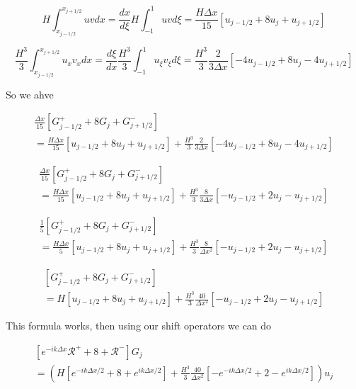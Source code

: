 \documentclass[12pt]{article}
\begin{document}
\[H\int_{x_{j-1/2}}^{x_{j+1/2}} uv dx = \frac{dx}{d\xi}H\int_{-1}^{1} uv d\xi =  \frac{H\Delta x}{15} \left[
u_{j - 1/2} + 8u_{j} + u_{j+1/2} \right]\]

\[\frac{H^3}{3}\int_{x_{j-1/2}}^{x_{j+1/2}}u_{x}v_{x}dx = \frac{d\xi}{dx}\frac{H^3}{3}\int_{-1}^{1} u_\xi v_\xi d\xi = \frac{H^3}{3} \frac{2}{3\Delta x}\left[ -
4u_{j - 1/2} + 8u_{j} - 4u_{j+1/2} \right]\]

So we ahve 

\begin{multline}
 \frac{\Delta x}{15} \left[
 G^+_{j - 1/2} + 8G_{j} + G^{-}_{j+1/2} \right] \\= \frac{H\Delta x}{15} \left[
 u_{j - 1/2} + 8u_{j} + u_{j+1/2} \right] + \frac{H^3}{3} \frac{2}{3\Delta x}\left[ -
 4u_{j - 1/2} + 8u_{j} - 4u_{j+1/2} \right]
\end{multline}

\begin{multline}
\frac{\Delta x}{15} \left[
G^+_{j - 1/2} + 8G_{j} + G^{-}_{j+1/2} \right] \\= \frac{H\Delta x}{15} \left[
u_{j - 1/2} + 8u_{j} + u_{j+1/2} \right] + \frac{H^3}{3} \frac{8}{3\Delta x}\left[ -
u_{j - 1/2} + 2u_{j} - u_{j+1/2} \right]
\end{multline}

\begin{multline}
\frac{1}{5} \left[
G^+_{j - 1/2} + 8G_{j} + G^{-}_{j+1/2} \right] \\= \frac{H\Delta x}{5} \left[
u_{j - 1/2} + 8u_{j} + u_{j+1/2} \right] + \frac{H^3}{3} \frac{8}{\Delta x^2}\left[ -
u_{j - 1/2} + 2u_{j} - u_{j+1/2} \right]
\end{multline}

\begin{multline}
 \left[
G^+_{j - 1/2} + 8G_{j} + G^{-}_{j+1/2} \right] \\= H \left[
u_{j - 1/2} + 8u_{j} + u_{j+1/2} \right] + \frac{H^3}{3} \frac{40}{\Delta x^2}\left[ -
u_{j - 1/2} + 2u_{j} - u_{j+1/2} \right]
\end{multline}

This formula works, then using our shift operators we can do

\begin{multline}
\left[
e^{-ik\Delta x}\mathcal{R}^+ + 8 + \mathcal{R}^- \right] G_{j} \\=\left( H \left[
e^{-ik\Delta x/2} + 8 + e^{ik\Delta x/2}\right] + \frac{H^3}{3} \frac{40}{\Delta x^2}\left[ -
e^{-ik\Delta x/2} + 2 - e^{ik\Delta x/2} \right] \right) u_j
\end{multline}
\end{document}
